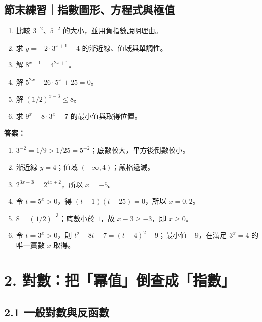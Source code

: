 \documentclass[11pt,a4paper]{article}
\providecommand{\tightlist}{%
  \setlength{\itemsep}{0pt}\setlength{\parskip}{0pt}}
\begin{document}
\begin{HandoutSelfCheck}

\subsection{節末練習｜指數圖形、方程式與極值}\label{ux7bc0ux672bux7df4ux7fd2ux6307ux6578ux5716ux5f62ux65b9ux7a0bux5f0fux8207ux6975ux503c}

\begin{enumerate}
\def\labelenumi{\arabic{enumi}.}
\tightlist
\item
  比較 \(3^{-2}\)、\(5^{-2}\) 的大小，並用負指數說明理由。
\item
  求 \(y=-2\cdot3^{x+1}+4\) 的漸近線、值域與單調性。
\item
  解 \(8^{x-1}=4^{2x+1}\)。
\item
  解 \(5^{2x}-26\cdot5^x+25=0\)。
\item
  解 \((1/2)^{x-3}\le8\)。
\item
  求 \(9^x-8\cdot3^x+7\) 的最小值與取得位置。
\end{enumerate}

\textbf{答案：}

\begin{enumerate}
\def\labelenumi{\arabic{enumi}.}
\tightlist
\item
  \(3^{-2}=1/9>1/25=5^{-2}\)；底數較大，平方後倒數較小。
\item
  漸近線 \(y=4\)；值域 \((-\infty,4)\)；嚴格遞減。
\item
  \(2^{3x-3}=2^{4x+2}\)，所以 \(x=-5\)。
\item
  令 \(t=5^x>0\)，得 \((t-1)(t-25)=0\)，所以 \(x=0,2\)。
\item
  \(8=(1/2)^{-3}\)；底數小於 \(1\)，故 \(x-3\ge-3\)，即 \(x\ge0\)。
\item
  令 \(t=3^x>0\)，則 \(t^2-8t+7=(t-4)^2-9\)；最小值 \(-9\)，在滿足 \(3^x=4\) 的唯一實數 \(x\) 取得。
\end{enumerate}

\end{HandoutSelfCheck}

\section{2. 對數：把「冪值」倒查成「指數」}\label{ux5c0dux6578ux628aux51aaux503cux5012ux67e5ux6210ux6307ux6578}

\subsection{2.1 一般對數與反函數}\label{ux4e00ux822cux5c0dux6578ux8207ux53cdux51fdux6578}
\end{document}
